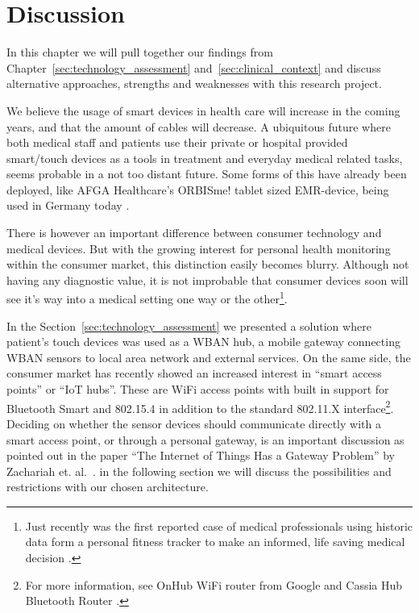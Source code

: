 \section{Discussion} %
\label{sec:discussion}

In this chapter we will pull together our findings from Chapter~\ref{sec:technology_assessment} and~\ref{sec:clinical_context} and discuss alternative approaches, strengths and weaknesses with this research project. 

We believe the usage of smart devices in health care will increase in the coming years, and that the amount of cables will decrease. A ubiquitous future where both medical staff and patients use their private or hospital provided smart/touch devices as a tools in treatment and everyday medical related tasks, seems probable in a not too distant future. Some forms of this have already been deployed, like AFGA Healthcare's ORBISme! tablet sized EMR-device, being used in Germany today \cite{newRef:271}. 

There is however an important difference between consumer technology and medical devices. But with the growing interest for personal health monitoring within the consumer market, this distinction easily becomes blurry. Although not having any diagnostic value, it is not improbable that consumer devices soon will see it's way into a medical setting one way or the other\footnote{ Just recently was the first reported case of medical professionals using historic data form a personal fitness tracker to make an informed, life saving medical decision \cite{newRef:29}.}.

In the Section~\ref{sec:technology_assessment} we presented a solution where patient's touch devices was used as a WBAN hub, a mobile gateway connecting WBAN sensors to local area network and external services. On the same side, the consumer market has recently showed an increased interest in ``smart access points'' or ``IoT hubs''. These are WiFi access points with built in support for Bluetooth Smart and 802.15.4 in addition to the standard 802.11.X interface\footnote{ For more information, see OnHub WiFi router from Google \cite{newRef:60} and Cassia Hub Bluetooth Router \cite{newRef:61}.}. Deciding on whether the sensor devices should communicate directly with a smart access point, or through a personal gateway, is an important discussion as pointed out in the paper ``The Internet of Things Has a Gateway Problem'' by Zachariah et. al.~\cite{Zachariah:2015cm}. in the following section we will discuss the possibilities and restrictions with our chosen architecture.

